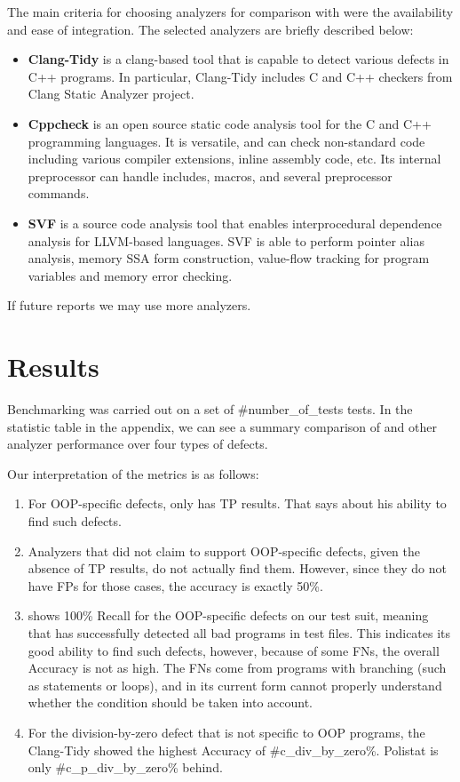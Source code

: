 The main criteria for choosing analyzers for comparison with \polystat{} were the availability and ease of integration. The selected analyzers are briefly described below:

\begin{itemize}
    \item \textbf{Clang-Tidy} is a clang-based tool that is capable to detect various defects in C++ programs. In particular, Clang-Tidy includes C and C++ checkers from Clang Static Analyzer project.
    \item \textbf{Cppcheck} is an open source static code analysis tool for the C and C++ programming languages. It is versatile, and can check non-standard code including various compiler extensions, inline  assembly code, etc. Its internal preprocessor can handle includes, macros, and several preprocessor commands.
    \item \textbf{SVF} is a source code analysis tool that enables interprocedural dependence analysis for LLVM-based languages. SVF is able to perform pointer alias analysis, memory SSA form construction, value-flow tracking for program variables and memory error checking.
\end{itemize}

If future reports we may use more analyzers.

\section{Results}
Benchmarking was carried out on a set of #number_of_tests tests. In the statistic table in the appendix, we can see a summary comparison of \polystat{} and other analyzer performance over four types of defects.

Our interpretation of the metrics is as follows:
\begin{enumerate}
    \item For OOP-specific defects, only \polystat{} has TP results. That says about his ability to find such defects.
    \item Analyzers that did not claim to support OOP-specific defects, given the absence of TP results, do not actually find them. However, since they do not have FPs for those cases, the accuracy is exactly 50\%.
    \item \polystat{} shows 100\% Recall for the OOP-specific defects on our test suit, meaning that \polystat{} has successfully detected all bad programs in test files. This indicates its good ability to find such defects, however, because of some FNs, the overall Accuracy is not as high. The FNs come from programs with branching (such as  statements or  loops), and in its current form \polystat{} cannot properly understand whether the condition should be taken into account.
    \item For the division-by-zero defect that is not specific to OOP programs, the Clang-Tidy showed the highest Accuracy of #c_div_by_zero\%. Polistat is only #c_p_div_by_zero\% behind.
\end{enumerate}

